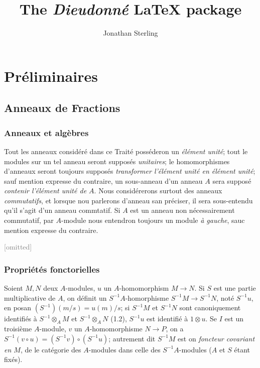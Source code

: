 \documentclass[oneside,french]{memoir}
\title{The \emph{Dieudonn\'e} \LaTeX{} package}
\author{Jonathan Sterling}
\begin{document}
\maketitle

\tableofcontents*

\mainmatter
{}
\chapter{Pr\'eliminaires}

\setcounter{secnumdepth}{30}

\section{Anneaux de Fractions}

\subsection{Anneaux et alg\`ebres}

\begin{node}
  Tout les anneaux consid\'er\'e dans ce Trait\'e poss\'ederon un
  \emph{\'el\'ement unit\'e}; tout le modules sur un tel anneau seront
  suppos\'es \emph{unitaires}; le homomorphismes d'anneaux seront toujours
  suppos\'es \emph{transformer l'\'el\'ement unit\'e en \'el\'ement unit\'e};
  sauf mention expresse du contraire, un sous-anneau d'un anneau $A$ sera
  suppos\'e \emph{contenir l'\'el\'ement unit\'e de $A$}. Nous consid\'ererons
  surtout des anneaux \emph{commutatifs}, et lorsque nou parlerons  d'anneau
  san pr\'eciser, il sera sous-entendu qu'il s'agit d'un anneau commtatif. Si
  $A$ est un anneau non n\'ecessairement commutatif, par $A$-module nous
  entendron toujours un module \emph{\`a gauche}, sauc mention expresse du
  contraire.
\end{node}


\textcolor{gray}{[omitted]}

\setcounter{subsection}{2}
\subsection{Propri\'et\'es fonctorielles}

\begin{node}
  Soient $M, N$ deux $A$-modules, $u$ un $A$-homomorphism $M\to N$. Si $S$ est
  une partie multiplicative de $A$, on d\'efinit un $S^{-1}A$-homorphisme
  $S^{-1}M\to S^{-1}N$, not\'e $S^{-1}u$, en posan $(S^{-1})(m/s) = u(m)/s$; si
  $S^{-1}M$ et $S^{-1}N$ sont canoniquement identifi\'es \`a
  $S^{-1}\otimes_{A}M$ et $S^{-1}\otimes_{A}N$ (1.2),
  $S^{-1}u$ est identifi\'e \`a $1\otimes u$. Se $I$ est un troisi\`eme
  $A$-module, $v$ un $A$-homomorphisme $N\to P$, on a $S^{-1}(v\circ u) =
  (S^{-1}v)\circ (S^{-1}u)$; autrement dit $S^{-1}M$ est on \emph{foncteur
  covariant en $M$}, de le cat\'egorie des $A$-modules dans celle des
  $S^{-1}A$-modules ($A$ et $S$ \'etant fix\'es).
\end{node}
\end{document}
